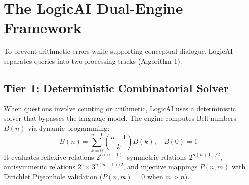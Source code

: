 \documentclass[conference]{IEEEtran}
\begin{document}
\section{The LogicAI Dual-Engine Framework}
To prevent arithmetic errors while supporting conceptual dialogue, LogicAI separates queries into two processing tracks (Algorithm 1).

\begin{figure}[htbp]
\centering
{}
\end{figure}

\subsection{Tier 1: Deterministic Combinatorial Solver}
When questions involve counting or arithmetic, LogicAI uses a deterministic solver that bypasses the language model. The engine computes Bell numbers $B(n)$ via dynamic programming:
\begin{equation}
B(n) = \sum_{k=0}^{n-1} \binom{n-1}{k} B(k), \quad B(0) = 1
\end{equation}
It evaluates reflexive relations $2^{n(n-1)}$, symmetric relations $2^{n(n+1)/2}$, antisymmetric relations $2^n \times 3^{n(n-1)/2}$, and injective mappings $P(n, m)$ with Dirichlet Pigeonhole validation ($P(n, m) = 0$ when $m > n$).
\end{document}
